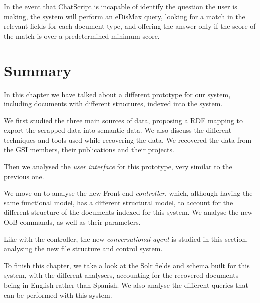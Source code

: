 In the event that ChatScript is incapable of identify the question the user is making, the system will perform an \ac{eDisMax} query, looking for a match in the relevant fields for each document type, and offering the answer only if the score of the match is over a predetermined minimum score.

\section{Summary}

In this chapter we have talked about a different prototype for our system, including documents with different structures, indexed into the system.

We first studied the three main sources of data, proposing a RDF mapping to export the scrapped data into semantic data. We also discuss the different techniques and tools used while recovering the data. We recovered the data from the GSI members, their publications and their projects.

Then we analysed the \emph{user interface} for this prototype, very similar to the previous one.

We move on to analyse the new Front-end \emph{controller}, which, although having the same functional model, has a different structural model, to account for the different structure of the documents indexed for this system. We analyse the new \ac{OoB} commands, as well as their parameters.

Like with the controller, the new \emph{conversational agent} is studied in this section, analysing the new file structure and control system.

To finish this chapter, we take a look at the Solr fields and schema built for this system, with the different analysers, accounting for the recovered documents being in English rather than Spanish. We also analyse the different queries that can be performed with this system.